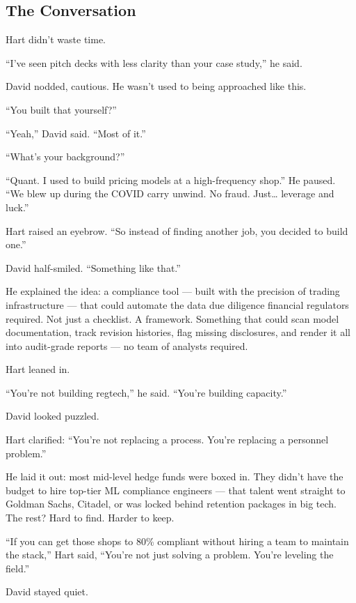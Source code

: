 \subsection{The Conversation}

Hart didn’t waste time.

“I’ve seen pitch decks with less clarity than your case study,” he said.

David nodded, cautious. He wasn’t used to being approached like this.

“You built that yourself?”

“Yeah,” David said. “Most of it.”

“What’s your background?”

“Quant. I used to build pricing models at a high-frequency shop.”  
He paused. “We blew up during the COVID carry unwind. No fraud. Just… leverage and luck.”

Hart raised an eyebrow. “So instead of finding another job, you decided to build one.”

David half-smiled. “Something like that.”

\medskip

He explained the idea: a compliance tool — built with the precision of trading infrastructure — that could automate the data due diligence financial regulators required.  
Not just a checklist. A framework. Something that could scan model documentation, track revision histories, flag missing disclosures, and render it all into audit-grade reports — no team of analysts required.

\medskip

Hart leaned in.

“You’re not building regtech,” he said. “You’re building capacity.”

David looked puzzled.

Hart clarified: “You’re not replacing a process. You’re replacing a personnel problem.”

\medskip

He laid it out: most mid-level hedge funds were boxed in. They didn’t have the budget to hire top-tier ML compliance engineers — that talent went straight to Goldman Sachs, Citadel, or was locked behind retention packages in big tech. The rest?  
Hard to find. Harder to keep.

“If you can get those shops to 80\% compliant without hiring a team to maintain the stack,” Hart said, “You’re not just solving a problem. You’re leveling the field.”

David stayed quiet.

